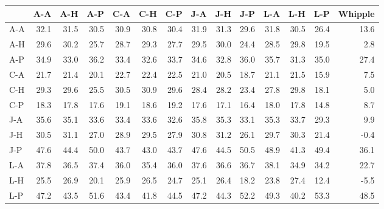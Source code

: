 \begin{tabular}{lrrrrrrrrrrrrr}
\toprule
{} &  A-A &  A-H &  A-P &  C-A &  C-H &  C-P &  J-A &  J-H &  J-P &  L-A &  L-H &  L-P &  Whipple \\
\midrule
A-A & 32.1 & 31.5 & 30.5 & 30.9 & 30.8 & 30.4 & 31.9 & 31.3 & 29.6 & 31.8 & 30.5 & 26.4 &     13.6 \\
A-H & 29.6 & 30.2 & 25.7 & 28.7 & 29.3 & 27.7 & 29.5 & 30.0 & 24.4 & 28.5 & 29.8 & 19.5 &      2.8 \\
A-P & 34.9 & 33.0 & 36.2 & 33.4 & 32.6 & 33.7 & 34.6 & 32.8 & 36.0 & 35.7 & 31.3 & 35.0 &     27.4 \\
C-A & 21.7 & 21.4 & 20.1 & 22.7 & 22.4 & 22.5 & 21.0 & 20.5 & 18.7 & 21.1 & 21.5 & 15.9 &      7.5 \\
C-H & 29.3 & 29.6 & 25.5 & 30.5 & 30.9 & 29.6 & 28.4 & 28.2 & 23.4 & 27.8 & 29.8 & 18.1 &      5.0 \\
C-P & 18.3 & 17.8 & 17.6 & 19.1 & 18.6 & 19.2 & 17.6 & 17.1 & 16.4 & 18.0 & 17.8 & 14.8 &      8.7 \\
J-A & 35.6 & 35.1 & 33.6 & 33.4 & 33.6 & 32.6 & 35.8 & 35.3 & 33.1 & 35.3 & 33.7 & 29.3 &      9.9 \\
J-H & 30.5 & 31.1 & 27.0 & 28.9 & 29.5 & 27.9 & 30.8 & 31.2 & 26.1 & 29.7 & 30.3 & 21.4 &     -0.4 \\
J-P & 47.6 & 44.4 & 50.0 & 43.7 & 43.0 & 43.7 & 47.6 & 44.5 & 50.5 & 48.9 & 41.3 & 49.4 &     36.1 \\
L-A & 37.8 & 36.5 & 37.4 & 36.0 & 35.4 & 36.0 & 37.6 & 36.6 & 36.7 & 38.1 & 34.9 & 34.2 &     22.7 \\
L-H & 25.5 & 26.9 & 20.1 & 25.9 & 26.5 & 24.7 & 25.1 & 26.4 & 18.2 & 23.8 & 27.4 & 12.4 &     -5.5 \\
L-P & 47.2 & 43.5 & 51.6 & 43.4 & 41.8 & 44.5 & 47.2 & 44.3 & 52.2 & 49.3 & 40.2 & 53.3 &     48.5 \\
\bottomrule
\end{tabular}
